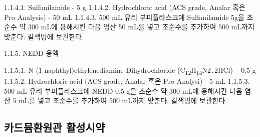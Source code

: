 \documentclass[
]{book}
\begin{document}
1.1.4.1. Sulfanilamide - 5 g
1.1.4.2. Hydrochloric acid (ACS grade, Analar 혹은 Pro Analysis) - 50 mL
1.1.4.3. 500 mL 유리 부피플라스크에 Sulfanilamide 5g을 초순수 약 300 mL에 용해시킨 다음 염산 50 mL를 넣고 초순수를 추가하여 500 mL까지 맞춘다. 갈색병에 보관한다.

1.1.5. NEDD 용액

1.1.5.1. N-(1-naphthyl)ethylenediamine Dihydrochloride (C\textsubscript{12}H\textsubscript{14}N2․2HCl) -- 0.5 g
1.1.5.2. Hydrochloric acid (ACS grade, Analar 혹은 Pro Analysi) - 5 mL
1.1.5.3. 500 mL 유리 부피플라스크에 NEDD 0.5 g을 초순수 약 300 mL에 용해시킨 다음 염산 5 mL를 넣고 초순수를 추가하여 500 mL까지 맞춘다. 갈색병에 보관한다.

\hypertarget{uxce74uxb4dcuxbbb4uxd658uxc6d0uxad00-uxd65cuxc131uxc2dcuxc57d}{%
\subsection{카드뮴환원관 활성시약}\label{uxce74uxb4dcuxbbb4uxd658uxc6d0uxad00-uxd65cuxc131uxc2dcuxc57d}}
\end{document}
